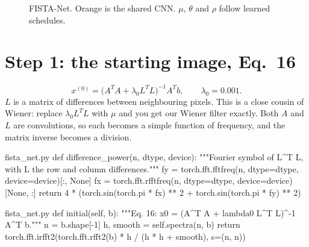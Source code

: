 \begin{figure}[H]
\centering
{}
\caption{FISTA-Net. Orange is the shared CNN. $\mu$, $\theta$ and $\rho$ follow learned schedules.}
\end{figure}

\section{Step 1: the starting image, Eq.~16}

\begin{equation}
x^{(0)} = \big(A^TA + \lambda_0 L^TL\big)^{-1} A^T b, \qquad \lambda_0 = 0.001. \tag{Eq.~16}
\end{equation}
$L$ is a matrix of differences between neighbouring pixels. This is a close cousin of Wiener: replace
$\lambda_0L^TL$ with $\mu$ and you get our Wiener filter exactly. Both $A$ and $L$ are convolutions, so each
becomes a simple function of frequency, and the matrix inverse becomes a division.

\begin{code*}{fista_net.py}
def difference_power(n, dtype, device):
    """Fourier symbol of L^T L, with L the row and column differences."""
    fy = torch.fft.fftfreq(n, dtype=dtype, device=device)[:, None]
    fx = torch.fft.rfftfreq(n, dtype=dtype, device=device)[None, :]
    return 4 * (torch.sin(torch.pi * fx) ** 2 + torch.sin(torch.pi * fy) ** 2)
\end{code*}

\begin{code*}{fista_net.py}
    def initial(self, b):
        """Eq. 16: x0 = (A^T A + lambda0 L^T L)^-1 A^T b."""
        n = b.shape[-1]
        h, smooth = self.spectra(n, b)
        return torch.fft.irfft2(torch.fft.rfft2(b) * h / (h * h + smooth), s=(n, n))
\end{code*}


